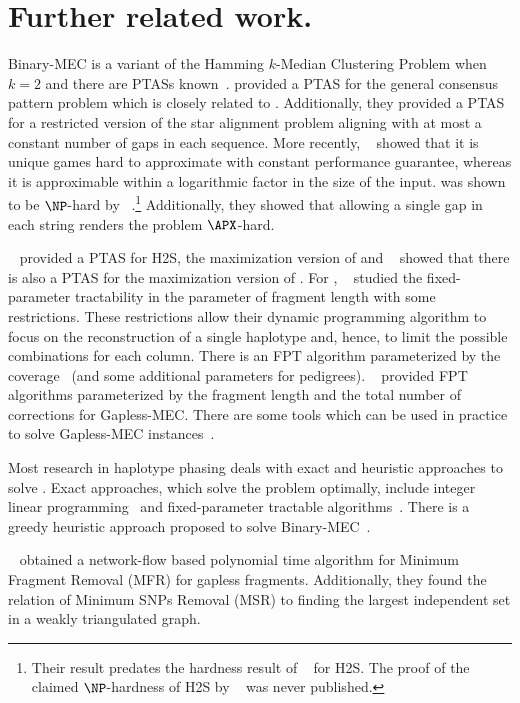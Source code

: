\section{Further related work.}
Binary-MEC is a variant of the Hamming $k$-Median Clustering Problem when $k = 2$ and there are PTASs known~\cite{JXL04_k, OR02_polynomial}. 
\cite{LMW02_finding} provided a PTAS for the general consensus pattern problem which is closely related to \MEC.
Additionally, they provided a PTAS for a restricted version of the star alignment problem aligning with at most a constant number of gaps in each sequence.
More recently, ~\cite{BDK+16_minimum} showed that it is unique games hard to approximate \MEC with constant performance guarantee, whereas it is approximable within a logarithmic factor in the size of the input. 
\GMEC was shown to be $\NP$-hard by ~\cite{Cilibrasi2007}.\footnote{Their result predates the hardness result of ~\cite{Fei14_np} for H2S. The proof of the claimed $\NP$-hardness of H2S by ~\cite{KPR98_segmentation} was never published.}
Additionally, they showed that allowing a single gap in each string renders the problem $\APX$-hard.


~\cite{AS99_two} provided a PTAS for H2S, the maximization version of \BMEC and ~\cite{WUB13_monochromatic} showed that there is also a PTAS for the maximization version of \MEC.
For \GMEC, ~\cite{he2010optimal} studied the fixed-parameter tractability in the parameter of fragment length with some restrictions.
These restrictions allow their dynamic programming algorithm to focus on the reconstruction of a single haplotype and, hence, to limit the possible combinations for each column.
There is an FPT algorithm parameterized by the coverage~\cite{Patterson2015,garg2016read} (and some additional parameters for pedigrees). 
~\cite{BDK+16_minimum} provided FPT algorithms parameterized by the fragment length and the total number of corrections for Gapless-MEC.
There are some tools which can be used in practice to solve Gapless-MEC instances~\cite{Pirola2015, Patterson2015}.

Most research in haplotype phasing deals with exact and heuristic approaches to solve \BMEC.
Exact approaches, which solve the problem optimally, include integer linear programming~\cite{Fouilhoux2012} and fixed-parameter tractable algorithms~\cite{he2010optimal, Pirola2015}.
There is a greedy heuristic approach proposed to solve Binary-MEC~\cite{Bansal2008}. 

~\cite{Lancia2001} obtained a network-flow based polynomial time algorithm for Minimum Fragment Removal (MFR) for gapless fragments.
Additionally, they found the relation of Minimum SNPs Removal (MSR) to finding the largest independent set in a weakly triangulated graph.

